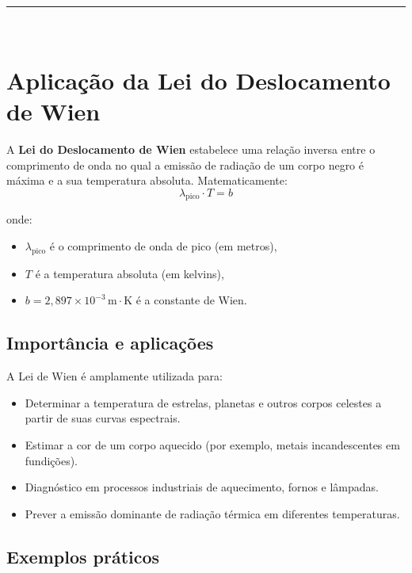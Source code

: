 \documentclass[a4paper,12pt]{article}
\begin{document}
\noindent\rule{\linewidth}{0.6pt}\\

\section*{Aplicação da Lei do Deslocamento de Wien}

A \textbf{Lei do Deslocamento de Wien} estabelece uma relação inversa entre o comprimento de onda no qual a emissão de radiação de um corpo negro é máxima e a sua temperatura absoluta. Matematicamente:
\[
\lambda_{\text{pico}} \cdot T = b
\]

onde:
\begin{itemize}
    \item \( \lambda_{\text{pico}} \) é o comprimento de onda de pico (em metros),
    \item \( T \) é a temperatura absoluta (em kelvins),
    \item \( b = 2,897 \times 10^{-3} \, \mathrm{m \cdot K} \) é a constante de Wien.
\end{itemize}

\subsection*{Importância e aplicações}

A Lei de Wien é amplamente utilizada para:
\begin{itemize}
    \item Determinar a temperatura de estrelas, planetas e outros corpos celestes a partir de suas curvas espectrais.
    \item Estimar a cor de um corpo aquecido (por exemplo, metais incandescentes em fundições).
    \item Diagnóstico em processos industriais de aquecimento, fornos e lâmpadas.
    \item Prever a emissão dominante de radiação térmica em diferentes temperaturas.
\end{itemize}

\subsection*{Exemplos práticos}
\end{document}

